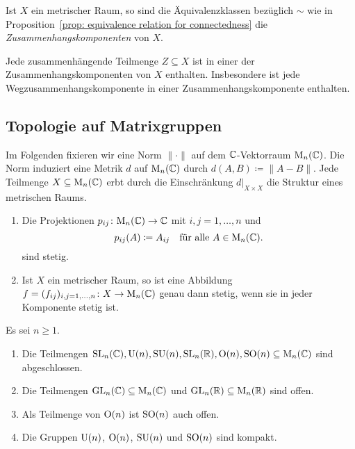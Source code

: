 \begin{definition}
  Ist $X$ ein metrischer Raum, so sind die Äquivalenzklassen bezüglich $\sim$ wie in Proposition~\ref{prop: equivalence relation for connectedness} die \emph{Zusammenhangskomponenten} von $X$.
\end{definition}


\begin{remark}
  Jede zusammenhängende Teilmenge $Z \subseteq X$ ist in einer der Zusammenhangskomponenten von $X$ enthalten.
  Insbesondere ist jede Wegzusammenhangskomponente in einer Zusammenhangskomponente enthalten.
\end{remark}










\subsection{Topologie auf Matrixgruppen}


Im Folgenden fixieren wir eine Norm $\|\cdot\|$ auf dem $\mathbb{C}$-Vektorraum $\mathrm{M}_n(\mathbb{C})$.
Die Norm induziert eine Metrik $d$ auf $\mathrm{M}_n(\mathbb{C})$ durch $d(A,B) \coloneqq \|A-B\|$.
Jede Teilmenge $X \subseteq \mathrm{M}_n(\mathbb{C})$ erbt durch die Einschränkung $d|_{X \times X}$ die Struktur eines metrischen Raums.


\begin{lemma}
  \begin{enumerate}[leftmargin=*, label=\roman*)]
    \item
      Die Projektionen $p_{ij} \colon \mathrm{M}_n(\mathbb{C}) \to \mathbb{C}$ mit $i,j = 1, \dotsc, n$ und
      \[
        p_{ij}(A) \coloneqq A_{ij}
        \quad
        \text{für alle $A \in \mathrm{M}_n(\mathbb{C})$}.
      \]
      sind stetig.
    \item
      Ist $X$ ein metrischer Raum, so ist eine Abbildung $f = (f_{ij})_{i,j = 1, \dotsc, n} \colon X \to \mathrm{M}_n(\mathbb{C})$ genau dann stetig, wenn sie in jeder Komponente stetig ist.
 \end{enumerate}
\end{lemma}


\begin{theorem}\label{prop: closedness of subgroups}
  Es sei $n \geq 1$.
  \begin{enumerate}[leftmargin=*, label=\roman*)]
    \item
      Die Teilmengen $\mathrm{SL}_n(\mathbb{C}), \mathrm{U}(n), \mathrm{SU}(n), \mathrm{SL}_n(\mathbb{R}), \mathrm{O}(n), \mathrm{SO}(n) \subseteq \mathrm{M}_n(\mathbb{C})$ sind abgeschlossen.
    \item
      Die Teilmengen $\mathrm{GL}_n(\mathbb{C}) \subseteq \mathrm{M}_n(\mathbb{C})$ und $\mathrm{GL}_n(\mathbb{R}) \subseteq \mathrm{M}_n(\mathbb{R})$ sind offen.
    \item
      Als Teilmenge von $\mathrm{O}(n)$ ist $\mathrm{SO}(n)$ auch offen.
    \item
      Die Gruppen $\mathrm{U}(n)$, $\mathrm{O}(n)$, $\mathrm{SU}(n)$ und $\mathrm{SO}(n)$ sind kompakt.
  \end{enumerate}
\end{theorem}



